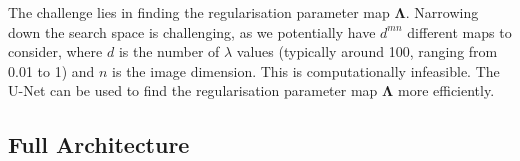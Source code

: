 \documentclass[12pt]{article}
\begin{document}






The challenge lies in finding the regularisation parameter map $\mathbf{\Lambda}$.  
Narrowing down the search space is challenging, as we potentially have $d^{m n}$ different maps to consider, where $d$ is the number of $\lambda$ values (typically around 100, ranging from 0.01 to 1) and $n$ is the image dimension. This is computationally infeasible. The U-Net can be used to find the 
regularisation parameter map $\mathbf{\Lambda}$
more efficiently.







\subsection{Full Architecture}
\end{document}
